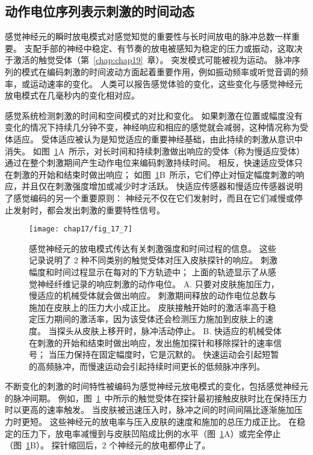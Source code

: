\subsection{动作电位序列表示刺激的时间动态}

感觉神经元的瞬时放电模式对感觉知觉的重要性与长时间放电的脉冲总数一样重要。 
支配手部的神经中稳定、有节奏的放电被感知为稳定的压力或振动，这取决于激活的触觉受体（第~\ref{chap:chap19}~章）。 
突发模式可能被视为运动。 
脉冲序列的模式在编码刺激的时间波动方面起着重要作用，例如振动频率或听觉音调的频率，或运动速率的变化。 
人类可以报告感觉体验的变化，这些变化与感觉神经元放电模式在几毫秒内的变化相对应。


感觉系统检测刺激的时间和空间模式的对比和变化。
如果刺激在位置或幅度没有变化的情况下持续几分钟不变，神经响应和相应的感觉就会减弱，这种情况称为受体适应。
受体适应被认为是知觉适应的重要神经基础，由此持续的刺激从意识中消失。
如图~\ref{fig:17_7}A~所示，对长时间和持续刺激做出响应的受体（称为慢适应受体）通过在整个刺激期间产生动作电位来编码刺激持续时间。
相反，快速适应受体只在刺激的开始和结束时做出响应；
如图~\ref{fig:17_7}B~所示，它们停止对恒定幅度刺激的响应，并且仅在刺激强度增加或减少时才活跃。
快适应传感器和慢适应传感器说明了感觉编码的另一个重要原则：
神经元不仅在它们发射时，而且在它们减慢或停止发射时，都会发出刺激的重要特性信号。


\begin{figure}[htbp]
	\centering
	\texttt{[image: chap17/fig\_17\_7]}
	\caption{感觉神经元的放电模式传达有关刺激强度和时间过程的信息。
		这些记录说明了 2 种不同类别的触觉受体对压入皮肤探针的响应。
		刺激幅度和时间过程显示在每对的下方轨迹中；
		上面的轨迹显示了从感觉神经纤维记录的响应刺激的动作电位。
		A. 只要对皮肤施加压力，慢适应的机械受体就会做出响应。
		刺激期间释放的动作电位总数与施加在皮肤上的压力大小成正比。
		皮肤接触开始时的激活率高于稳定压力期间的激活率，因为该受体还会检测压力施加到皮肤上的速度。
		当探头从皮肤上移开时，脉冲活动停止\cite{mountcastle1966neural}。
		B. 快适应的机械受体在刺激的开始和结束时做出响应，发出施加探针和移除探针的速率信号；
		当压力保持在固定幅度时，它是沉默的。
		快速运动会引起短暂的高频脉冲，而慢速运动会引起持续时间更长的低频脉冲序列\cite{talbot1968sense}。}
	\label{fig:17_7}
\end{figure}


不断变化的刺激的时间特性被编码为感觉神经元放电模式的变化，包括感觉神经元的脉冲间期。
例如，图~\ref{fig:17_7}~中所示的触觉受体在探针最初接触皮肤时比在保持压力时以更高的速率触发。
当皮肤被迅速压入时，脉冲之间的时间间隔比逐渐施加压力时更短。
这些神经元的放电率与压入皮肤的速度和施加的总压力成正比。
在稳定的压力下，放电率减慢到与皮肤凹陷成比例的水平（图~\ref{fig:17_7}A）或完全停止（图~\ref{fig:17_7}B）。
探针缩回后，2 个神经元的放电都停止了。


